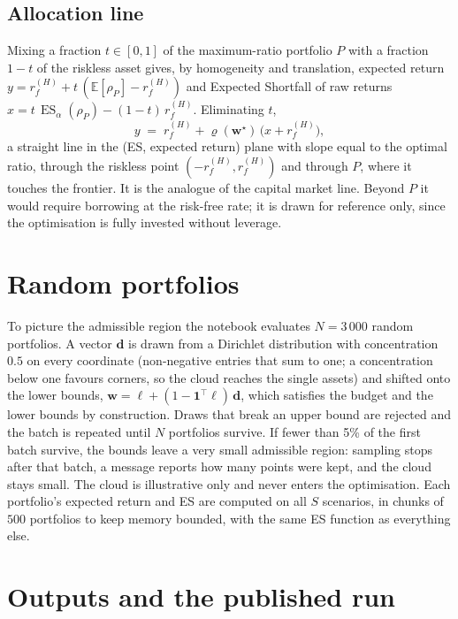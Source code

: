 \documentclass[11pt,a4paper]{article}
\newcommand{\ES}{\operatorname{ES}}
\newcommand{\E}{\mathbb{E}}
\newcommand{\w}{\mathbf{w}}
\newcommand{\ones}{\mathbf{1}}
\theoremstyle{plain}
\theoremstyle{remark}
\begin{document}
\subsection{Allocation line}
\label{sec:cal}

Mixing a fraction $t\in[0,1]$ of the maximum-ratio portfolio $P$ with a
fraction $1-t$ of the riskless asset gives, by homogeneity and translation,
expected return $y = r_f^{(H)} + t\,(\E[\rho_P] - r_f^{(H)})$ and Expected
Shortfall of raw returns $x = t\,\ES_\alpha(\rho_P) - (1-t)\,r_f^{(H)}$.
Eliminating $t$,
\begin{equation}
  y \;=\; r_f^{(H)} + \varrho(\w^\star)\,\bigl(x + r_f^{(H)}\bigr),
  \label{eq:cal}
\end{equation}
a straight line in the (ES, expected return) plane with slope equal to the
optimal ratio, through the riskless point $(-r_f^{(H)}, r_f^{(H)})$ and
through $P$, where it touches the frontier. It is the analogue of the
capital market line. Beyond $P$ it would require borrowing at the risk-free
rate; it is drawn for reference only, since the optimisation is fully
invested without leverage.

\section{Random portfolios}
\label{sec:cloud}

To picture the admissible region the notebook evaluates $N = 3\,000$ random
portfolios. A vector $\mathbf d$ is drawn from a Dirichlet distribution with
concentration $0.5$ on every coordinate (non-negative entries that sum to
one; a concentration below one favours corners, so the cloud reaches the
single assets) and shifted onto the lower bounds,
$\w = \boldsymbol\ell + (1 - \ones^\top\boldsymbol\ell)\,\mathbf d$, which
satisfies the budget and the lower bounds by construction. Draws that break
an upper bound are rejected and the batch is repeated until $N$ portfolios
survive. If fewer than 5\% of the first batch survive, the bounds leave a
very small admissible region: sampling stops after that batch, a message
reports how many points were kept, and the cloud stays small. The cloud is
illustrative only and never enters the optimisation. Each portfolio's
expected return and ES are computed on all $S$ scenarios, in chunks of
$500$ portfolios to keep memory bounded, with the same ES function as
everything else.

\section{Outputs and the published run}
\label{sec:outputs}
\end{document}
